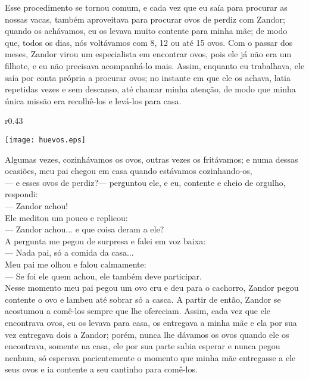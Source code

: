 Esse procedimento se tornou comum, e cada vez que eu saía para procurar as nossas vacas, também aproveitava para procurar ovos de perdiz com Zandor; quando os achávamos, eu os levava muito contente para minha mãe; de modo que, todos os dias, nós voltávamos com 8, 12 ou até 15 ovos. 
Com o passar dos meses, Zandor virou um especialista em encontrar ovos, pois ele já não era um filhote, e eu não precisava acompanhá-lo mais. Assim, enquanto eu trabalhava, ele saía por conta própria a procurar ovos; no instante em que ele os achava, latia repetidas vezes e sem descanso, até chamar minha atenção, de modo que minha única missão era recolhê-los e levá-los para casa.
\ifdefined\EnableIncludeImages
\begin{wrapfigure}{r}{0.43\textwidth}
  \begin{center}
  \vspace{-20pt}
    \texttt{[image: huevos.eps]}
  \end{center}
  \vspace{-20pt}
\end{wrapfigure}
\fi
Algumas vezes, cozinhávamos os ovos, outras vezes os fritávamos; e numa dessas ocasiões, meu pai chegou em casa quando estávamos cozinhando-os,\\\indent
--- e esses ovos de perdiz?--- perguntou ele, 
e eu, contente e cheio de orgulho, respondi:\\\indent 
--- Zandor achou!\\\indent
Ele meditou um pouco e replicou:\\\indent 
--- Zandor achou... e que coisa deram a ele?\\\indent
A pergunta me pegou de surpresa e falei em voz baixa:\\\indent 
--- Nada pai, só a comida da casa... \\\indent
Meu pai me olhou e falou calmamente: \\\indent
--- Se foi ele quem achou, ele também deve participar.\\\indent
Nesse momento meu pai pegou um ovo cru e deu para o cachorro, Zandor pegou contente o ovo e lambeu até sobrar só a casca. A partir de então, Zandor se acostumou a comê-los sempre que lhe ofereciam. 
Assim, cada vez que ele encontrava ovos, eu os levava para casa, os entregava a minha mãe e ela por sua vez entregava dois a Zandor; porém, nunca lhe dávamos os ovos quando ele os encontrava, somente na casa, ele por sua parte sabia esperar e nunca pegou nenhum, só esperava pacientemente o momento que minha mãe entregasse a ele seus ovos e ia contente a seu cantinho para comê-los.


